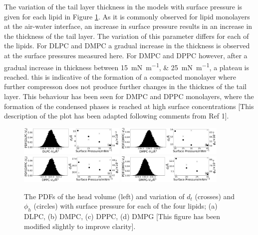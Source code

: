 \documentclass[amsmath,amssymb,twocolumn,superscriptaddress]{revtex4-1}
\begin{document}
The variation of the tail layer thickness in the models with surface pressure is given for each lipid in Figure \ref{fig:lipresults}.
As it is commonly observed for lipid monolayers at the air-water interface, an increase in surface pressure results in an increase in the thickness of the tail layer.
The variation of this parameter differs for each of the lipids.
For DLPC and DMPC a gradual increase in the thickness is observed at the surface pressures measured here.
For DMPC and DPPC however, after a gradual increase in thickness between \SIlist{15;25}{\milli\newton\per\meter}, a plateau is reached.
this is indicative of the formation of a compacted monolayer where further compresson does not produce further changes in the thicknes of the tail layer.
This behaviour has been seen for DMPC and DPPC monolayers, where the formation of the condensed phases is reached at high surface concentrations \cite{mohwald_phospholipid_1990} [This description of the plot has been adapted following comments from Ref 1].
%
\begin{figure}
    \centering
  \includegraphics[width=0.45\textwidth]{figures/dlpc_vh_dt_phi}
    \includegraphics[width=0.45\textwidth]{figures/dmpc_vh_dt_phi}
    \includegraphics[width=0.45\textwidth]{figures/dppc_vh_dt_phi}
    \includegraphics[width=0.45\textwidth]{figures/dmpg_vh_dt_phi}
    \caption{\small The PDFs of the head volume (left) and variation of
  $d_t$ (crosses) and $\phi_h$ (circles) with surface pressure for each of
  the four lipids; (a) DLPC, (b) DMPC, (c) DPPC, (d) DMPG [This figure has been modified slightly to improve clarity].}
    \label{fig:lipresults}
\end{figure}
%
\end{document}
